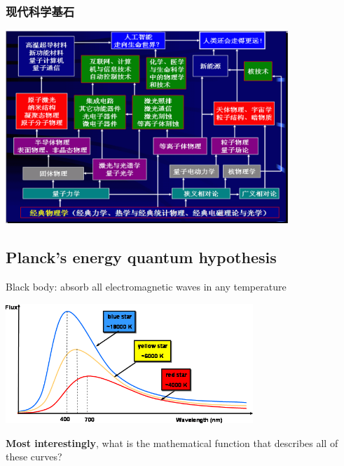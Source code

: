 \begin{frame}
    \frametitle{现代科学基石}
    \begin{center}
        \includegraphics[width=0.8\textwidth]{figs/stone.png}
    \end{center}   
\end{frame}

\subsection{Planck's energy quantum hypothesis}

\begin{frame}
    \begin{definition}
        Black body: absorb all electromagnetic waves in any temperature
    \end{definition}
    \begin{center}
        \includegraphics[width=0.7\textwidth]{figs/blackbody_radn_curves.png}
    \end{center}
    \textbf{\color{deepred} Most interestingly}, what is the mathematical function that describes all of these curves?
\end{frame}

